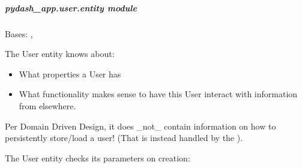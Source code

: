 \documentclass[letterpaper,10pt,english]{sphinxmanual}
\begin{document}
\subparagraph{pydash\_app.user.entity module}
\label{\detokenize{pydash_app.user.entity:module-pydash_app.user.entity}}\label{\detokenize{pydash_app.user.entity:pydash-app-user-entity-module}}\label{\detokenize{pydash_app.user.entity::doc}}

\begin{fulllineitems}
\label{\detokenize{pydash_app.user.entity:pydash_app.user.entity.User}}
Bases: , 

The User entity knows about:
\begin{itemize}
\item {} 
What properties a User has

\item {} 
What functionality makes sense to have this User interact with information from elsewhere.

\end{itemize}

Per Domain Driven Design, it does \_not\_ contain information on how to persistently store/load a user!
(That is instead handled by the ).

The User entity checks its parameters on creation:

%
\begin{sphinxVerbatim}[commandchars=\\\{\}]
  
\end{sphinxVerbatim}

\begin{fulllineitems}
\label{\detokenize{pydash_app.user.entity:pydash_app.user.entity.User.check_password}}
\end{fulllineitems}



\end{fulllineitems}
\end{document}
